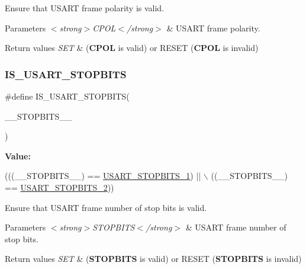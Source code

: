 Ensure that U\+S\+A\+RT frame polarity is valid. 


\begin{DoxyParams}{Parameters}
{\em $<$strong$>$\+C\+P\+O\+L$<$/strong$>$} & U\+S\+A\+RT frame polarity. \\
\hline
\end{DoxyParams}

\begin{DoxyRetVals}{Return values}
{\em S\+ET} & ({\bfseries C\+P\+OL} is valid) or R\+E\+S\+ET ({\bfseries C\+P\+OL} is invalid) \\
\hline
\end{DoxyRetVals}
\mbox{\label{group___u_s_a_r_t___private___macros_ga7a724f758480c009bc3e591d12fd0343}} 
\subsubsection{\texorpdfstring{I\+S\+\_\+\+U\+S\+A\+R\+T\+\_\+\+S\+T\+O\+P\+B\+I\+TS}{IS\_USART\_STOPBITS}}
{\footnotesize\ttfamily \#define I\+S\+\_\+\+U\+S\+A\+R\+T\+\_\+\+S\+T\+O\+P\+B\+I\+TS(\begin{DoxyParamCaption}\item[{}]{\+\_\+\+\_\+\+S\+T\+O\+P\+B\+I\+T\+S\+\_\+\+\_\+ }\end{DoxyParamCaption})}

{\bfseries Value\+:}
\begin{DoxyCode}
(((\_\_STOPBITS\_\_) == \hyperlink{group___u_s_a_r_t___stop___bits_ga82aae3118e9cd59bb270c028e21c23b4}{USART\_STOPBITS\_1})   || \(\backslash\)
                                         ((\_\_STOPBITS\_\_) == \hyperlink{group___u_s_a_r_t___stop___bits_gaf8d022e62f55ceb7b5e03eea336b5c45}{USART\_STOPBITS\_2}))
\end{DoxyCode}


Ensure that U\+S\+A\+RT frame number of stop bits is valid. 


\begin{DoxyParams}{Parameters}
{\em $<$strong$>$\+S\+T\+O\+P\+B\+I\+T\+S$<$/strong$>$} & U\+S\+A\+RT frame number of stop bits. \\
\hline
\end{DoxyParams}

\begin{DoxyRetVals}{Return values}
{\em S\+ET} & ({\bfseries S\+T\+O\+P\+B\+I\+TS} is valid) or R\+E\+S\+ET ({\bfseries S\+T\+O\+P\+B\+I\+TS} is invalid) \\
\hline
\end{DoxyRetVals}
